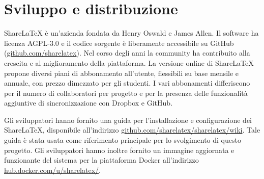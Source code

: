 \section{Sviluppo e distribuzione}
ShareLaTeX è un'azienda fondata da Henry Oswald e James Allen. Il software ha licenza AGPL-3.0 e il codice sorgente è liberamente accessibile su GitHub (\url{github.com/sharelatex}). Nel corso degli anni la community ha contribuito alla crescita e al miglioramento della piattaforma. La versione online di ShareLaTeX propone diversi piani di abbonamento all'utente, flessibili su base mensile e annuale, con prezzo dimezzato per gli studenti. I vari abbonamenti differiscono per il numero di collaboratori per progetto e per la presenza delle funzionalità aggiuntive di sincronizzazione con Dropbox e GitHub.

Gli sviluppatori hanno fornito una guida per l'installazione e configurazione dei ShareLaTeX, disponibile all'indirizzo \url{github.com/sharelatex/sharelatex/wiki}. Tale guida è stata usata come riferimento principale per lo svolgimento di questo progetto. Gli sviluppatori hanno inoltre fornito un immagine aggiornata e funzionante del sistema per la piattaforma Docker all'indirizzo \url{hub.docker.com/u/sharelatex/}.

